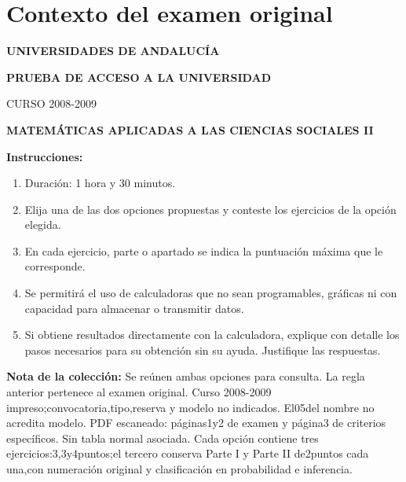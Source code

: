 \section*{Contexto del examen original}
\textbf{UNIVERSIDADES DE ANDALUCÍA}\par
\textbf{PRUEBA DE ACCESO A LA UNIVERSIDAD}\par
CURSO 2008-2009\par
\textbf{MATEMÁTICAS APLICADAS A LAS CIENCIAS SOCIALES II}

\textbf{Instrucciones:}
\begin{enumerate}[label=\textbf{\alph*)}]
  \item Duración: 1 hora y 30 minutos.
  \item Elija una de las dos opciones propuestas y conteste los ejercicios de la opción elegida.
  \item En cada ejercicio, parte o apartado se indica la puntuación máxima que le corresponde.
  \item Se permitirá el uso de calculadoras que no sean programables, gráficas ni con capacidad para almacenar o transmitir datos.
  \item Si obtiene resultados directamente con la calculadora, explique con detalle los pasos necesarios para su obtención sin su ayuda. Justifique las respuestas.
\end{enumerate}
\noindent\textbf{Nota de la colección:} Se reúnen ambas opciones para consulta. La regla anterior pertenece al examen original. Curso 2008-2009 impreso;convocatoria,tipo,reserva y modelo no indicados. El05del nombre no acredita modelo. PDF escaneado: páginas1y2 de examen y página3 de criterios específicos. Sin tabla normal asociada. Cada opción contiene tres ejercicios:3,3y4puntos;el tercero conserva Parte I y Parte II de2puntos cada una,con numeración original y clasificación en probabilidad e inferencia.
\par\medskip
